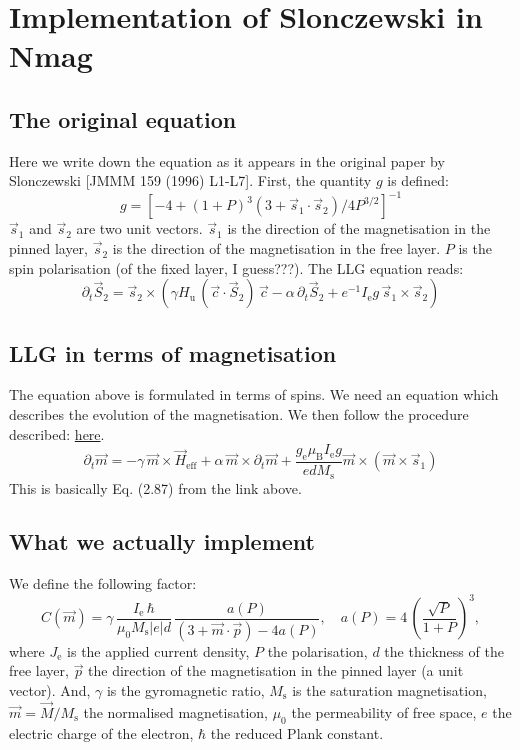 \documentclass[11pt]{article}
\newcommand{\vv}[1]{\vec{#1}}
\newcommand{\vvM}{\vv{M}}
\newcommand{\vvm}{\vv{m}}
\newcommand{\vvH}{\vv{H}_{\mathrm{eff}}}
\newcommand{\vvfix}{\vv{p}}
\newcommand{\Msat}{M_{\mathrm{s}}}
\newcommand{\derivp}[2]{\partial_{#2} #1}
\begin{document}
\section{Implementation of Slonczewski in Nmag}

\subsection{The original equation}
Here we write down the equation as it appears in the original paper
by Slonczewski [JMMM 159 (1996) L1-L7].
First, the quantity $g$ is defined:
$$
g = \left[ -4 + (1 + P)^3 (3 + \vv{s}_1 \cdot \vv{s}_2)/ 4 P^{3/2} \right]^{-1}
$$
$\vv{s}_1$ and $\vv{s}_2$ are two unit vectors.
$\vv{s}_1$ is the direction of the magnetisation in the pinned layer,
$\vv{s}_2$ is the direction of the magnetisation in the free layer.
$P$ is the spin polarisation (of the fixed layer, I guess???).
The LLG equation reads:
$$
\derivp{\vv{S}_2}{t} = 
  \vv{s}_2 \times 
    \left( \gamma H_{\mathrm{u}} \, (\vv{c} \cdot \vv{S}_2) \, \vv{c}
          - \alpha \, \derivp{\vv{S}_2}{t}
          + e^{-1} I_{\mathrm{e}} g \, \vv{s}_1 \times \vv{s}_2 \right)
$$

\subsection{LLG in terms of magnetisation}
The equation above is formulated in terms of spins.
We need an equation which describes the evolution of the magnetisation.
We then follow the procedure described:
\href{http://wpage.unina.it/mdaquino/PhD\_thesis/main/node47.html}{here}.
$$
\derivp{\vvm}{t} =
   -\gamma \, \vvm \times \vvH 
  + \alpha \, \vvm \times \derivp{\vvm}{t}
  + \frac{g_{\mathrm{e}} \mu_{\mathrm{B}} I_{\mathrm{e}} g}{ed\Msat} \vvm \times (\vvm \times \vv{s}_1)
$$
This is basically Eq. (2.87) from the link above.

\subsection{What we actually implement}
We define the following factor:
$$
C(\vvm) = 
  \gamma \,
  \frac{I_{\mathrm{e}} \, \hbar}{\mu_0 \Msat |e| d} \,
  \frac{a(P)}{(3 + \vvm \cdot \vvfix) - 4 a(P)},
\quad
a(P) = 4 \, \left( \frac{\sqrt{P}}{1 + P} \right)^3,
$$
where $J_{\mathrm{e}}$ is the applied current density, $P$ the polarisation,
$d$ the thickness of the free layer, $\vvfix$ the direction of the
magnetisation in the pinned layer (a unit vector).
%
And, $\gamma$ is the gyromagnetic ratio,
$\Msat$ is the saturation magnetisation,
$\vvm = \vvM/\Msat$ the normalised magnetisation, $\mu_0$ the permeability
of free space, $e$ the electric charge of the electron,
$\hbar$ the reduced Plank constant.
\end{document}
